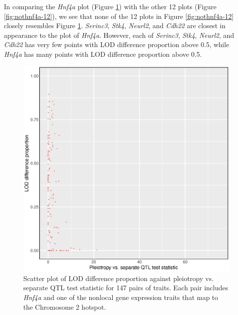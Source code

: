 \documentclass{article}
\begin{document}
\begin{boehm}
In comparing the \emph{Hnf4a} plot (Figure \ref{fig:hnf4a}) with the other 12 plots (Figure \ref{fig:nothnf4a-12}), we see that none of the 12 plots in Figure \ref{fig:nothnf4a-12} closely resembles Figure \ref{fig:hnf4a}. \emph{Serinc3}, \emph{Stk4}, \emph{Neurl2}, and \emph{Cdh22} are closest in appearance to the plot of \emph{Hnf4a}. However, each of \emph{Serinc3}, \emph{Stk4}, \emph{Neurl2}, and \emph{Cdh22} has very few points with LOD difference proportion above 0.5, while \emph{Hnf4a} has many points with LOD difference proportion above 0.5.

\begin{figure}
    \centering
    \includegraphics[width = \textwidth]{../Rmd/Hnf4a-lod-diff-prop-v-lrt.eps}
    \caption{Scatter plot of LOD difference proportion against pleiotropy vs. separate QTL test statistic for 147 pairs of traits. Each pair includes \emph{Hnf4a} and one of the nonlocal gene expression traits that map to the Chromosome 2 hotspot.}
    \label{fig:hnf4a}
\end{figure}


\end{boehm}
\end{document}
